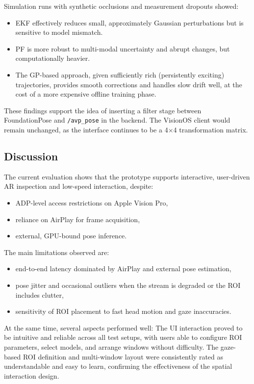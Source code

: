 Simulation runs with synthetic occlusions and measurement dropouts showed:

\begin{itemize}
    \item EKF effectively reduces small, approximately Gaussian perturbations but is sensitive to model mismatch.
    \item PF is more robust to multi-modal uncertainty and abrupt changes, but computationally heavier.
    \item The GP-based approach, given sufficiently rich (persistently exciting) trajectories, provides smooth corrections and handles slow drift well, at the cost of a more expensive offline training phase.
\end{itemize}

These findings support the idea of inserting a filter stage between FoundationPose and \texttt{/avp\_pose} in the backend. The VisionOS client would remain unchanged, as the interface continues to be a 4$\times$4 transformation matrix.

\subsection{Discussion}

The current evaluation shows that the prototype supports interactive, user-driven AR inspection and low-speed interaction, despite:

\begin{itemize}
    \item ADP-level access restrictions on Apple Vision Pro,
    \item reliance on AirPlay for frame acquisition,
    \item external, GPU-bound pose inference.
\end{itemize}

The main limitations observed are:

\begin{itemize}
    \item end-to-end latency dominated by AirPlay and external pose estimation,
    \item pose jitter and occasional outliers when the stream is degraded or the ROI includes clutter,
    \item sensitivity of ROI placement to fast head motion and gaze inaccuracies.
\end{itemize}

At the same time, several aspects performed well: The UI interaction proved to be intuitive and reliable across all test setups, with users able to configure ROI parameters, select models, and arrange windows without difficulty. The gaze-based ROI definition and multi-window layout were consistently rated as understandable and easy to learn, confirming the effectiveness of the spatial interaction design.

